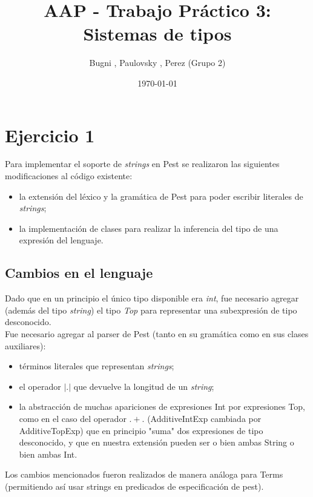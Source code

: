 \documentclass[a4paper]{article}
\begin{document}
\title{AAP - Trabajo Práctico 3: Sistemas de tipos}
\date{\today}

\author{Bugni , Paulovsky , Perez (Grupo 2)}

\maketitle

\section{Ejercicio 1}

Para implementar el soporte de \emph{strings} en Pest se realizaron las siguientes modificaciones al código existente:

\begin{itemize}
\item la extensión del léxico y la gramática de Pest para poder escribir literales de \emph{strings};
\item la implementación de clases para realizar la inferencia del tipo de una expresión del lenguaje.
\end{itemize}

\subsection{Cambios en el lenguaje}

Dado que en un principio el único tipo disponible era \emph{int}, fue necesario agregar (además del tipo \emph{string}) el tipo \emph{Top} para representar una subexpresión de tipo desconocido. 
\\

Fue necesario agregar al parser de Pest (tanto en su gramática como en sus clases auxiliares):

\begin{itemize}
\item términos literales que representan \emph{strings};
\item el operador $|.|$ que devuelve la longitud de un \emph{string};
\item la abstracción de muchas apariciones de expresiones Int por expresiones Top, como en el caso del operador $.+.$ (AdditiveIntExp cambiada por AdditiveTopExp) que en principio "suma" dos expresiones de tipo desconocido, y que en nuestra extensión pueden ser o bien ambas String o bien ambas Int.
\end{itemize}

Los cambios mencionados fueron realizados de manera análoga para Terms (permitiendo así usar strings en predicados de especificación de pest).
\end{document}
